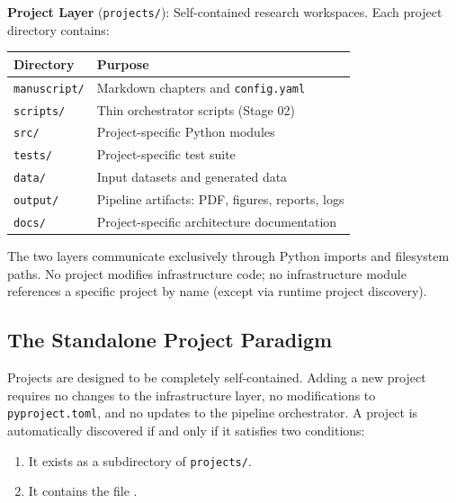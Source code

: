 \documentclass[
  english,
]{article}
\newcounter{none} %
\providecommand{\tightlist}{%
  \setlength{\itemsep}{0pt}\setlength{\parskip}{0pt}}
\begin{document}
\textbf{Project Layer} (\texttt{projects/}): Self-contained research
workspaces. Each project directory contains:

{\def\LTcaptype{none} %
\begin{longtable}[]{@{}ll@{}}
\toprule\noalign{}
Directory & Purpose \\
\midrule\noalign{}
\endhead
\bottomrule\noalign{}
\endlastfoot
\texttt{manuscript/} & Markdown chapters and \texttt{config.yaml} \\
\texttt{scripts/} & Thin orchestrator scripts (Stage 02) \\
\texttt{src/} & Project-specific Python modules \\
\texttt{tests/} & Project-specific test suite \\
\texttt{data/} & Input datasets and generated data \\
\texttt{output/} & Pipeline artifacts: PDF, figures, reports, logs \\
\texttt{docs/} & Project-specific architecture documentation \\
\end{longtable}
}

The two layers communicate exclusively through Python imports and
filesystem paths. No project modifies infrastructure code; no
infrastructure module references a specific project by name (except via
runtime project discovery).

\subsection{The Standalone Project
Paradigm}\label{the-standalone-project-paradigm}

Projects are designed to be completely self-contained. Adding a new
project requires no changes to the infrastructure layer, no
modifications to \texttt{pyproject.toml}, and no updates to the pipeline
orchestrator. A project is automatically discovered if and only if it
satisfies two conditions:

\begin{enumerate}
\def\labelenumi{\arabic{enumi}.}
\tightlist
\item
  It exists as a subdirectory of \texttt{projects/}.
\item
  It contains the file .
\end{enumerate}
\end{document}
